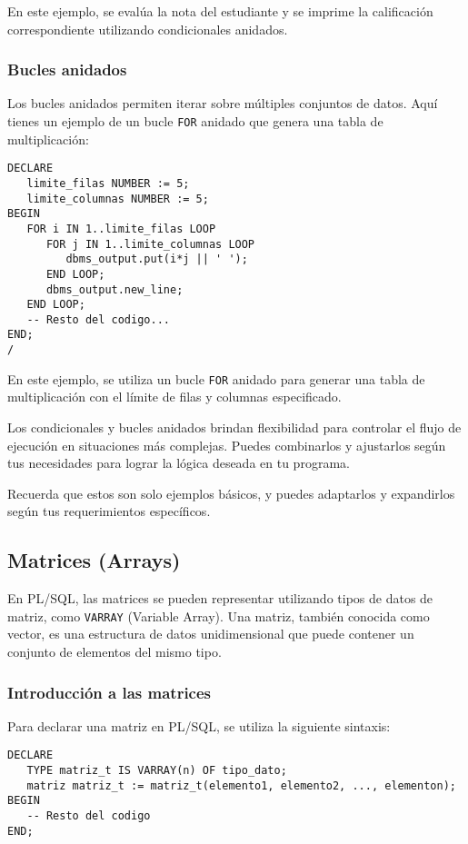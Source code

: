 \documentclass[executivepaper]{article}
\begin{document}
En este ejemplo, se evalúa la nota del estudiante y se imprime la calificación correspondiente utilizando condicionales anidados.

\subsubsection*{Bucles anidados}

Los bucles anidados permiten iterar sobre múltiples conjuntos de datos. Aquí tienes un ejemplo de un bucle \texttt{FOR} anidado que genera una tabla de multiplicación:

\begin{lstlisting}
DECLARE
   limite_filas NUMBER := 5;
   limite_columnas NUMBER := 5;
BEGIN
   FOR i IN 1..limite_filas LOOP
      FOR j IN 1..limite_columnas LOOP
         dbms_output.put(i*j || ' ');
      END LOOP;
      dbms_output.new_line;
   END LOOP;
   -- Resto del codigo...
END;
/
\end{lstlisting}

En este ejemplo, se utiliza un bucle \texttt{FOR} anidado para generar una tabla de multiplicación con el límite de filas y columnas especificado.

Los condicionales y bucles anidados brindan flexibilidad para controlar el flujo de ejecución en situaciones más complejas. Puedes combinarlos y ajustarlos según tus necesidades para lograr la lógica deseada en tu programa.

Recuerda que estos son solo ejemplos básicos, y puedes adaptarlos y expandirlos según tus requerimientos específicos.

\subsection{Matrices (Arrays)}

En PL/SQL, las matrices se pueden representar utilizando tipos de datos de matriz, como \texttt{VARRAY} (Variable Array). Una matriz, también conocida como vector, es una estructura de datos unidimensional que puede contener un conjunto de elementos del mismo tipo.

\subsubsection*{Introducción a las matrices}

Para declarar una matriz en PL/SQL, se utiliza la siguiente sintaxis:

\begin{lstlisting}
DECLARE
   TYPE matriz_t IS VARRAY(n) OF tipo_dato;
   matriz matriz_t := matriz_t(elemento1, elemento2, ..., elementon);
BEGIN
   -- Resto del codigo
END;
\end{lstlisting}
\end{document}
